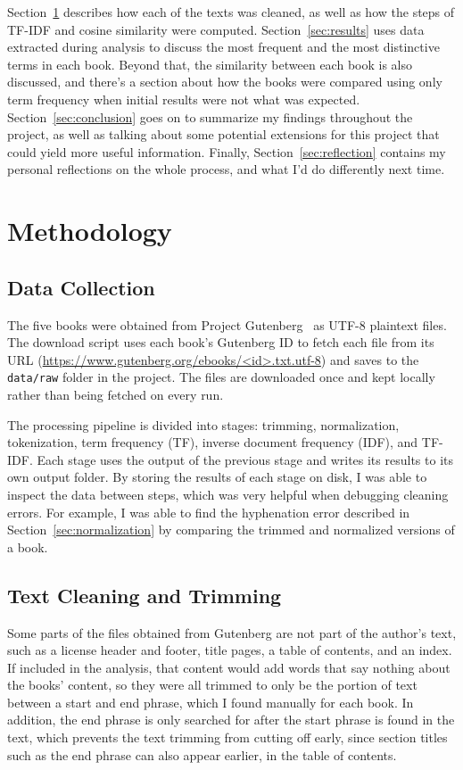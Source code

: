\documentclass[11pt]{article}
\begin{document}
Section~\ref{sec:methodology} describes how each of the texts was cleaned, as well as how the steps of TF-IDF and cosine similarity were computed.
Section~\ref{sec:results} uses data extracted during analysis to discuss the most frequent and the most distinctive terms in each book.
Beyond that, the similarity between each book is also discussed, and there's a section about how the books were compared using only term frequency when initial results were not what was expected.
Section~\ref{sec:conclusion} goes on to summarize my findings throughout the project, as well as talking about some potential extensions for this project that could yield more useful information.
Finally, Section~\ref{sec:reflection} contains my personal reflections on the whole process, and what I'd do differently next time.

\section{Methodology}
\label{sec:methodology}

\subsection{Data Collection}
The five books were obtained from Project Gutenberg~\cite{gutenberg} as UTF-8 plaintext files.
The download script uses each book's Gutenberg ID to fetch each file from its URL (\url{https://www.gutenberg.org/ebooks/<id>.txt.utf-8}) and saves to the \texttt{data/raw} folder in the project.
The files are downloaded once and kept locally rather than being fetched on every run.

The processing pipeline is divided into stages: trimming, normalization, tokenization, term frequency (TF), inverse document frequency (IDF), and TF-IDF.
Each stage uses the output of the previous stage and writes its results to its own output folder.
By storing the results of each stage on disk, I was able to inspect the data between steps, which was very helpful when debugging cleaning errors.
For example, I was able to find the hyphenation error described in Section~\ref{sec:normalization} by comparing the trimmed and normalized versions of a book.

\subsection{Text Cleaning and Trimming}
Some parts of the files obtained from Gutenberg are not part of the author's text, such as a license header and footer, title pages, a table of contents, and an index.
If included in the analysis, that content would add words that say nothing about the books' content, so they were all trimmed to only be the portion of text between a start and end phrase, which I found manually for each book.
In addition, the end phrase is only searched for after the start phrase is found in the text, which prevents the text trimming from cutting off early, since section titles such as the end phrase can also appear earlier, in the table of contents.
\end{document}

